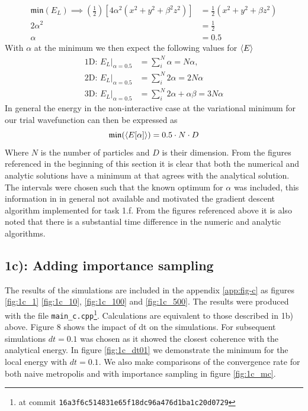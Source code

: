 \begin{align}
\mathfrak{min}(E_L)  \implies \left(\frac{1}{2}\right)[4\alpha^2 (x^2 + y^2 + \beta^2 z^2) ] &= \frac{1}{2} (x^2 + y^2 + \beta z^2) \\
 2 \alpha ^2  &= \frac{1}{2} \\
 \alpha &= 0.5
\end{align}
With $\alpha$ at the minimum we then expect the following values for $\langle E \rangle$
\begin{equation}
\begin{split}
\text{1D: }E_L |_{\alpha = 0.5} &= \sum_i^N \alpha = N \alpha,\\
\text{2D: }E_L|_{\alpha = 0.5} &= \sum_i^N  2\alpha = 2N \alpha \\
\text{3D: }E_L|_{\alpha = 0.5} &= \sum_i^N  2\alpha + \alpha \beta  = 3N\alpha
\end{split}
\end{equation}
In general the energy in the non-interactive case at the variational minimum for our trial wavefunction can then be expressed as 
\begin{equation}
\mathfrak{min}(\langle E[\alpha] \rangle) = 0.5 \cdot N \cdot D  
\end{equation}
Where $N$ is the number of particles and $D$ is their dimension. From the figures referenced in the beginning of this section it is clear that both the numerical and analytic solutions have a minimum at that  agrees with the analytical solution. The intervals  were chosen such that the known optimum for $\alpha$ was included, this information in in general not available and motivated the gradient descent algorithm implemented for task 1.f. From the figures referenced above it is also noted that there is a substantial time difference in the numeric and analytic algorithms. 

\subsection*{\textbf{1c):} Adding importance sampling}

The results of the simulations are included in the appendix \ref{app:fig-c} as figures \ref{fig:1c_1} \ref{fig:1c_10}, \ref{fig:1c_100} and \ref{fig:1c_500}. 
The results were produced with the file \lstinline{main_c.cpp}\footnote{at commit \lstinline{16a3f6c514831e65f18dc96a476d1ba1c20d0729}}. 
Calculations are equivalent to those described in 1b) above.
Figure 8 shows the impact of dt on the simulations. For subsequent simulations $dt = 0.1$ was chosen as it showed the closest coherence with  the analytical energy.  
In figure \ref{fig:1c_dt01} we demonstrate the minimum for the local energy with $dt = 0.1$. 
We also make comparisons of the convergence rate for both naive metropolis and with importance sampling in figure \ref{fig:1c_mc}.

